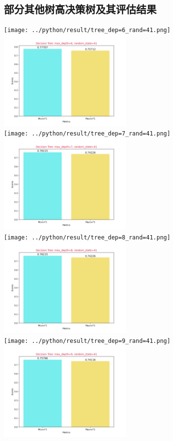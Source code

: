 \documentclass{article}
\begin{document}
\subsection{部分其他树高决策树及其评估结果}
\texttt{[image: ../python/result/tree\_dep=6\_rand=41.png]}
\includegraphics[width=0.5\textwidth]{../python/result/score_dep=6_rand=41.png}\\
\texttt{[image: ../python/result/tree\_dep=7\_rand=41.png]}
\includegraphics[width=0.5\textwidth]{../python/result/score_dep=7_rand=41.png}\\
\texttt{[image: ../python/result/tree\_dep=8\_rand=41.png]}
\includegraphics[width=0.5\textwidth]{../python/result/score_dep=8_rand=41.png}\\
\texttt{[image: ../python/result/tree\_dep=9\_rand=41.png]}
\includegraphics[width=0.5\textwidth]{../python/result/score_dep=9_rand=41.png}\\
\end{document}
